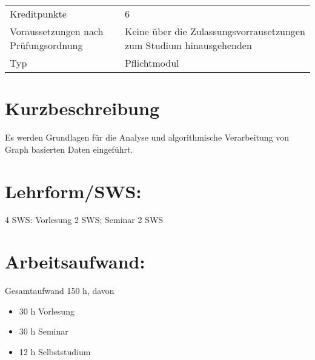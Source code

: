 \begin{longtable}[]{@{}ll@{}}
\begin{minipage}[t]{0.12\columnwidth}\raggedright\strut
Kreditpunkte\strut
\end{minipage} & \begin{minipage}[t]{0.12\columnwidth}\raggedright\strut
6\strut
\end{minipage}\tabularnewline
\begin{minipage}[t]{0.12\columnwidth}\raggedright\strut
Voraussetzungen nach Prüfungsordnung\strut
\end{minipage} & \begin{minipage}[t]{0.12\columnwidth}\raggedright\strut
Keine über die Zulassungsvorrausetzungen zum Studium
hinausgehenden\strut
\end{minipage}\tabularnewline
\begin{minipage}[t]{0.12\columnwidth}\raggedright\strut
Typ\strut
\end{minipage} & \begin{minipage}[t]{0.12\columnwidth}\raggedright\strut
Pflichtmodul\strut
\end{minipage}\tabularnewline
\bottomrule
\end{longtable}

\section*{Kurzbeschreibung}\label{kurzbeschreibung-1}

Es werden Grundlagen für die Analyse und algorithmische Verarbeitung von
Graph basierten Daten eingeführt.

\section*{Lehrform/SWS:}\label{lehrformsws-2}

4 SWS: Vorlesung 2 SWS; Seminar 2 SWS

\section*{Arbeitsaufwand:}\label{arbeitsaufwand-2}

Gesamtaufwand 150 h, davon

\begin{itemize}
\item
  30 h Vorlesung
\item
  30 h Seminar
\item
  12 h Selbststudium
\end{itemize}

